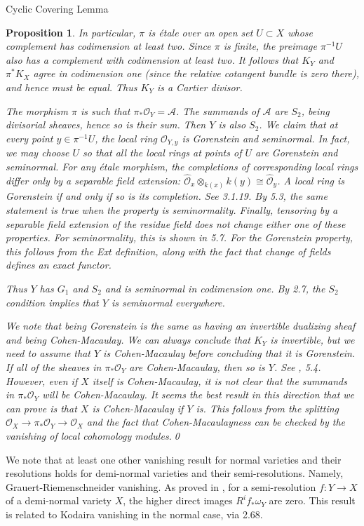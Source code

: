 \documentclass{article}
\newtheorem{proposition}[theorem]{Proposition}
\begin{document}
\begin{section}{Cyclic Covering Lemma}
\begin{proposition}
In particular, $\pi$ is \'etale over an open set $U \subset X$ whose complement has codimension at least two.  Since $\pi$ is finite, the preimage $\pi^{-1}U$ also has a complement with codimension at least two.  It follows that $K_Y$ and $\pi^*K_X$ agree in codimension one (since the relative cotangent bundle is zero there), and hence must be equal.  Thus $K_Y$ is a Cartier divisor.

The morphism $\pi$ is such that $\pi_*\mathcal{O}_Y = \mathcal{A}$.  The summands of $\mathcal{A}$ are $S_2$, being divisorial sheaves, hence so is their sum.  Then $Y$ is also $S_2$.  We claim that at every point $y \in \pi^{-1}U$, the local ring $\mathcal{O}_{Y,y}$ is Gorenstein and seminormal.  In fact, we may choose $U$ so that all the local rings at points of $U$ are Gorenstein and seminormal.  For any \'etale morphism, the completions of corresponding local rings differ only by a separable field extension:  $\hat{\mathcal{O}}_x \otimes_{k(x)} k(y) \cong \hat{\mathcal{O}}_y$.  A local ring is Gorenstein if and only if so is its completion.  See \cite{BH98} 3.1.19.  By \cite{GT80} 5.3, the same statement is true when the property is seminormality.  Finally, tensoring by a separable field extension of the residue field does not change either one of these properties.  For seminormality, this is shown in \cite{GT80} 5.7.  For the Gorenstein property, this follows from the Ext definition, along with the fact that change of fields defines an exact functor.  

Thus $Y$ has $G_1$ and $S_2$ and is seminormal in codimension one.  By \cite{GT80} 2.7, the $S_2$ condition implies that $Y$ is seminormal everywhere.

We note that being Gorenstein is the same as having an invertible dualizing sheaf and being Cohen-Macaulay.  We can always conclude that $K_Y$ is invertible, but we need to assume that $Y$ is Cohen-Macaulay before concluding that it is Gorenstein.  If all of the sheaves in $\pi_*\mathcal{O}_Y$ are Cohen-Macaulay, then so is $Y$.  See \cite{KM98}, 5.4.  However, even if $X$ itself is Cohen-Macaulay, it is not clear that the summands in $\pi_*\mathcal{O}_Y$ will be Cohen-Macaulay.  It seems the best result in this direction that we can prove is that $X$ is Cohen-Macaulay if $Y$ is.  This follows from the splitting $\mathcal{O}_X \rightarrow \pi_*\mathcal{O}_Y \rightarrow \mathcal{O}_X$ and the fact that Cohen-Macaulayness can be checked by the vanishing of local cohomology modules.\qed
\end{proposition}

We note that at least one other vanishing result for normal varieties and their resolutions holds for demi-normal varieties and their semi-resolutions.  Namely, Grauert-Riemenschneider vanishing.  As proved in \cite{Berq14}, for a semi-resolution $f: Y \rightarrow X$ of a demi-normal variety $X$, the higher direct images $R^if_*\omega_Y$ are zero.  This result is related to Kodaira vanishing in the normal case, via \cite{KM98} 2.68.
\end{section}
\nocite{BH98}
\nocite{GT80}
\nocite{KM98}
\nocite{Berq14}





\end{document}
